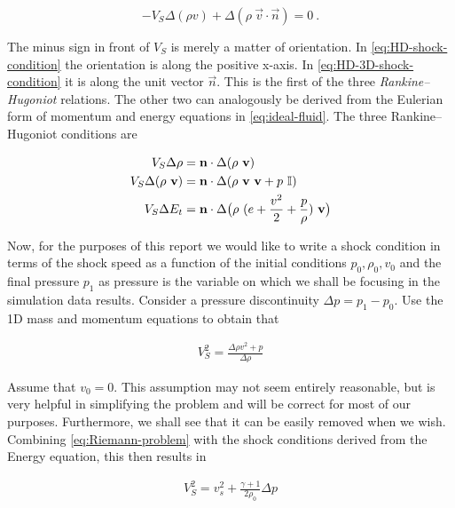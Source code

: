 \begin{equation}
\label{eq:HD-3D-shock-condition}
- V_S \Delta(\rho v) + \Delta(\rho \ \vec{v} \cdot \vec{n}) = 0 \ .
\end{equation}

The minus sign in front of $V_S$ is merely a matter of orientation. In \cref{eq:HD-shock-condition} the orientation is along the positive x-axis. In \cref{eq:HD-3D-shock-condition} it is along the unit vector $\vec{n}$. This is the first of the three \textit{Rankine–Hugoniot} relations. The other two can analogously be derived from the Eulerian form of momentum and energy equations in \cref{eq:ideal-fluid}. The three Rankine–Hugoniot conditions are

\begin{equation}
\label{HD-shock-conditions}
\begin{split}
V_S \Delta \rho &= \vec{n}\cdot\Delta(\rho \ \vec{v})\\
V_S \Delta (\rho \ \vec{v}) &= \vec{n} \cdot \Delta(\rho \ \vec{v} \ \vec{v} + p \ \I) \\
V_S \Delta E_t &= \vec{n} \cdot \Delta \big (\rho \ (e + \frac{v^2}{2} + \frac{p}{\rho}) \ \vec{v} \big)
\end{split}
\end{equation}


Now, for the purposes of this report we would like to write a shock condition in terms of the shock speed as a function of the initial conditions $p_0, \rho_0, v_0$ and the final pressure $p_1$ as pressure is the variable on which we shall be focusing in the simulation data results. Consider a pressure discontinuity $\Delta p = p_1 - p_0$. Use the 1D mass and momentum equations to obtain that

\begin{equation}
\label{eq:Riemann-problem}
\begin{split}
V_S^2 = \frac{\Delta \rho v^2 + p}{\Delta \rho}   
\end{split}
\end{equation}

Assume that $v_0 = 0$. This assumption may not seem entirely reasonable, but is very helpful in simplifying the problem and will be correct for most of our purposes. Furthermore, we shall see that it can be easily removed when we wish. Combining \cref{eq:Riemann-problem} with the shock conditions derived from the Energy equation, this then results in 

\begin{equation}
\label{eq:Riemann-solution}
\begin{split}
V_S^2 = v_s^2 + \frac{\gamma + 1}{2 \rho_0} \Delta p
\end{split}
\end{equation}


